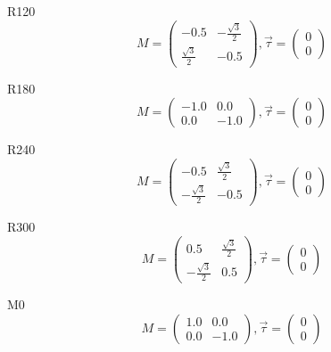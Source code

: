 \documentclass[12pt, fleqn]{article}
\begin{document}
R120
\begin{equation}
    M=
    \begin{pmatrix}
        -0.5&-\frac{\sqrt{3}}{2}\\
        \frac{\sqrt{3}}{2}&-0.5
    \end{pmatrix}
    ,\vec{\tau}=
    \begin{pmatrix}
        0\\
        0
    \end{pmatrix}
    \label{R120}
\end{equation}

R180
\begin{equation}
    M=
    \begin{pmatrix}
        -1.0&0.0\\
        0.0&-1.0
    \end{pmatrix}
    ,\vec{\tau}=
    \begin{pmatrix}
        0\\
        0
    \end{pmatrix}
    \label{R180}
\end{equation}

R240
\begin{equation}
    M=
    \begin{pmatrix}
        -0.5&\frac{\sqrt{3}}{2}\\
        -\frac{\sqrt{3}}{2}&-0.5
    \end{pmatrix}
    ,\vec{\tau}=
    \begin{pmatrix}
        0\\
        0
    \end{pmatrix}
    \label{R240}
\end{equation}

R300
\begin{equation}
    M=
    \begin{pmatrix}
        0.5&\frac{\sqrt{3}}{2}\\
        -\frac{\sqrt{3}}{2}&0.5
    \end{pmatrix}
    ,\vec{\tau}=
    \begin{pmatrix}
        0\\
        0
    \end{pmatrix}
    \label{R300}
\end{equation}

M0
\begin{equation}
    M=
    \begin{pmatrix}
        1.0&0.0\\
        0.0&-1.0
    \end{pmatrix}
    ,\vec{\tau}=
    \begin{pmatrix}
        0\\
        0
    \end{pmatrix}
    \label{M0}
\end{equation}
\end{document}
